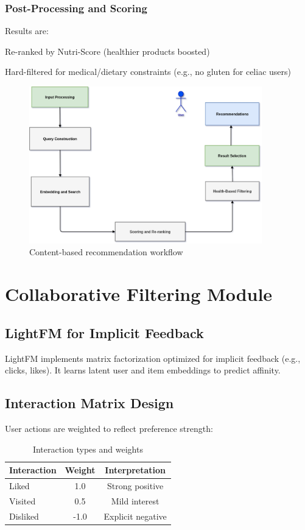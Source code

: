 \subsubsection{Post-Processing and Scoring}
Results are:
\item Re-ranked by Nutri-Score (healthier products boosted)
    \item Hard-filtered for medical/dietary constraints (e.g., no gluten for celiac users)

\begin{figure}[H]
\centering
\includegraphics[width=0.9\textwidth]{images/CB_recommendation_workflow_simple.png}
\caption{Content-based recommendation workflow}
\label{fig:cb_workflow}
\end{figure}

\section{Collaborative Filtering Module}
\subsection{LightFM for Implicit Feedback}
LightFM implements matrix factorization optimized for implicit feedback (e.g., clicks, likes). It learns latent user and item embeddings to predict affinity.


\subsection{Interaction Matrix Design}
User actions are weighted to reflect preference strength:

\begin{table}[H]
\centering
\caption{Interaction types and weights}
\label{tab:interaction_weights}
\begin{tabular}{lcc}
\toprule
\textbf{Interaction} & \textbf{Weight} & \textbf{Interpretation} \\
\midrule
Liked & 1.0 & Strong positive \\
Visited & 0.5 & Mild interest \\
Disliked & -1.0 & Explicit negative \\
\bottomrule
\end{tabular}
\end{table}

